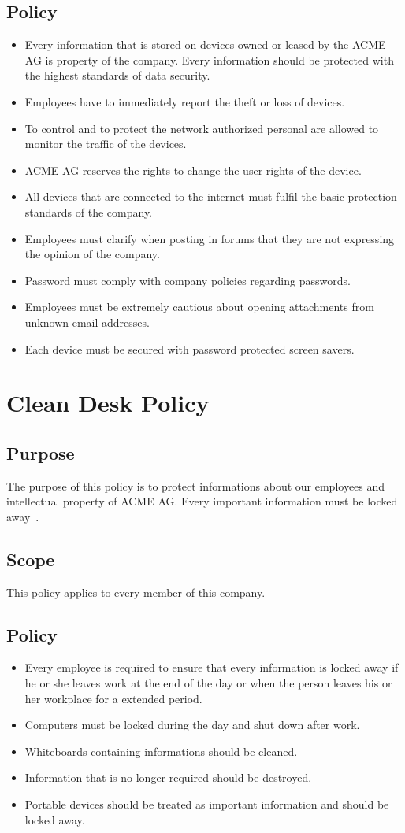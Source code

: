 \section{Policy}
\begin{itemize}
\item Every information that is stored on devices owned or leased by the ACME AG is property of the company. Every information should be protected with the highest standards of data security.
\item Employees have to immediately report the  theft or loss of  devices.
\item To control and to protect the network authorized personal are allowed to monitor the traffic of the devices.
\item ACME AG reserves the rights to change the user rights of the device.
\item All devices that are connected to the internet must fulfil the basic protection standards of the company.
\item Employees must clarify when posting in forums that they are not expressing the opinion of the company. 
\item Password must comply with company policies regarding passwords.
\item Employees must be extremely cautious about opening attachments from unknown email addresses.
\item Each device must be secured with password protected screen savers.
\end{itemize}
\chapter{Clean Desk Policy}
\section{Purpose}
The purpose of this policy is to protect informations about our employees and intellectual property of ACME AG. Every important information must be locked away~\cite{Sans}.
\section{Scope} 
This policy applies to every member of this company.
\section{Policy}
\begin{itemize}
\item Every employee is required to ensure that every information is locked away if he or she leaves work  at the end of the day or when the person leaves his or her workplace for a extended period.
\item Computers must be locked during the day and shut down after work.
\item Whiteboards containing informations should be cleaned.
\item Information that is no longer required should be destroyed.
\item Portable devices should be treated as important information and should be locked away.
\end{itemize}

